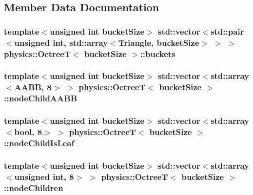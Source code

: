 \subsection{Member Data Documentation}
\hypertarget{classphysics_1_1OctreeT_ac01b644236033dec94c0ede8dcea2dda}{
\subsubsection[{buckets}]{\setlength{\rightskip}{0pt plus 5cm}template$<$unsigned int bucket\-Size$>$ std\-::vector$<$std\-::pair$<$unsigned int, std\-::array$<${\bf Triangle}, bucket\-Size$>$ $>$ $>$ {\bf physics\-::\-Octree\-T}$<$ bucket\-Size $>$\-::buckets}}\label{classphysics_1_1OctreeT_ac01b644236033dec94c0ede8dcea2dda}
\hypertarget{classphysics_1_1OctreeT_a20d242370208fa365b2fabedee4d005e}{
\subsubsection[{node\-Child\-A\-A\-B\-B}]{\setlength{\rightskip}{0pt plus 5cm}template$<$unsigned int bucket\-Size$>$ std\-::vector$<$std\-::array$<${\bf A\-A\-B\-B}, 8$>$ $>$ {\bf physics\-::\-Octree\-T}$<$ bucket\-Size $>$\-::node\-Child\-A\-A\-B\-B}}\label{classphysics_1_1OctreeT_a20d242370208fa365b2fabedee4d005e}
\hypertarget{classphysics_1_1OctreeT_acec9534e74150f0cd93dc24256e324f6}{
\subsubsection[{node\-Child\-Is\-Leaf}]{\setlength{\rightskip}{0pt plus 5cm}template$<$unsigned int bucket\-Size$>$ std\-::vector$<$std\-::array$<$bool, 8$>$ $>$ {\bf physics\-::\-Octree\-T}$<$ bucket\-Size $>$\-::node\-Child\-Is\-Leaf}}\label{classphysics_1_1OctreeT_acec9534e74150f0cd93dc24256e324f6}
\hypertarget{classphysics_1_1OctreeT_a7ff3ce7346a421ad4619a837c4fafc61}{
\subsubsection[{node\-Children}]{\setlength{\rightskip}{0pt plus 5cm}template$<$unsigned int bucket\-Size$>$ std\-::vector$<$std\-::array$<$unsigned int, 8$>$ $>$ {\bf physics\-::\-Octree\-T}$<$ bucket\-Size $>$\-::node\-Children}}\label{classphysics_1_1OctreeT_a7ff3ce7346a421ad4619a837c4fafc61}
